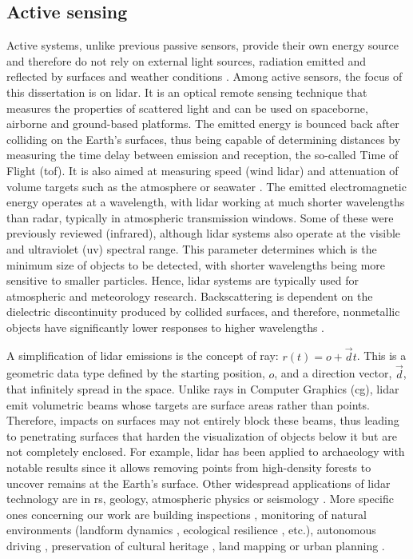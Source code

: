 \subsection{Active sensing}

Active systems, unlike previous passive sensors, provide their own energy source and therefore do not rely on external light sources, radiation emitted and reflected by surfaces and weather conditions \cite{dong_lidar_2018}. Among active sensors, the focus of this dissertation is on \acrshort{lidar}. It is an optical remote sensing technique that measures the properties of scattered light and can be used on spaceborne, airborne and ground-based platforms. The emitted energy is bounced back after colliding on the Earth's surfaces, thus being capable of determining distances by measuring the time delay between emission and reception, the so-called Time of Flight (\acrshort{tof}). It is also aimed at measuring speed (wind \acrshort{lidar}) and attenuation of volume targets such as the atmosphere or seawater \cite{emery_introduction_2017}. The emitted electromagnetic energy operates at a wavelength, with \acrshort{lidar} working at much shorter wavelengths than radar, typically in atmospheric transmission windows. Some of these were previously reviewed (infrared), although \acrshort{lidar} systems also operate at the visible and ultraviolet (\acrshort{uv}) spectral range. This parameter determines which is the minimum size of objects to be detected, with shorter wavelengths being more sensitive to smaller particles. Hence, \acrshort{lidar} systems are typically used for atmospheric and meteorology research. Backscattering is dependent on the dielectric discontinuity produced by collided surfaces, and therefore, nonmetallic objects have significantly lower responses to higher wavelengths \cite{dong_lidar_2018}. 

A simplification of \acrshort{lidar} emissions is the concept of ray: $r(t) = o + \vec{d}t$. This is a geometric data type defined by the starting position, $o$, and a direction vector, $\vec{d}$, that infinitely spread in the space. Unlike rays in Computer Graphics (\acrshort{cg}), \acrshort{lidar} emit volumetric beams whose targets are surface areas rather than points. Therefore, impacts on surfaces may not entirely block these beams, thus leading to penetrating surfaces that harden the visualization of objects below it but are not completely enclosed. For example, \acrshort{lidar} has been applied to archaeology with notable results since it allows removing points from high-density forests to uncover remains at the Earth's surface. Other widespread applications of \acrshort{lidar} technology are in \acrshort{rs}, geology, atmospheric physics or seismology \cite{emery_introduction_2017}. More specific ones concerning our work are building inspections \cite{shariq_revolutionising_2020}, monitoring of natural environments (landform dynamics \cite{guisado-pintado_3d_2019}, ecological resilience \cite{mitasova_geospatial_2010}, etc.), autonomous driving \cite{kuutti_survey_2021}, preservation of cultural heritage \cite{andriasyan_point_2020}, land mapping or urban planning \cite{zhou_street-view_2022}.


